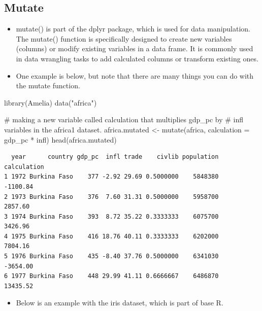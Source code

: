 \documentclass[
  letterpaper,
  DIV=11,
  numbers=noendperiod]{scrreprt}
\newenvironment{Shaded}{\begin{snugshade}}{\end{snugshade}}
\newcommand{\AttributeTok}[1]{\textcolor[rgb]{0.40,0.45,0.13}{#1}}
\newcommand{\CommentTok}[1]{\textcolor[rgb]{0.37,0.37,0.37}{#1}}
\newcommand{\FunctionTok}[1]{\textcolor[rgb]{0.28,0.35,0.67}{#1}}
\newcommand{\NormalTok}[1]{\textcolor[rgb]{0.00,0.23,0.31}{#1}}
\newcommand{\OtherTok}[1]{\textcolor[rgb]{0.00,0.23,0.31}{#1}}
\newcommand{\SpecialCharTok}[1]{\textcolor[rgb]{0.37,0.37,0.37}{#1}}
\newcommand{\StringTok}[1]{\textcolor[rgb]{0.13,0.47,0.30}{#1}}
\providecommand{\tightlist}{%
  \setlength{\itemsep}{0pt}\setlength{\parskip}{0pt}}\usepackage{longtable,booktabs,array}
\begin{document}
\subsection{Mutate}\label{mutate}

\begin{itemize}
\tightlist
\item
  mutate() is part of the dplyr package, which is used for data
  manipulation. The mutate() function is specifically designed to create
  new variables (columns) or modify existing variables in a data frame.
  It is commonly used in data wrangling tasks to add calculated columns
  or transform existing ones.
\item
  One example is below, but note that there are many things you can do
  with the mutate function.
\end{itemize}

\begin{Shaded}
\begin{Highlighting}[]
\FunctionTok{library}\NormalTok{(Amelia)}
\FunctionTok{data}\NormalTok{(}\StringTok{"africa"}\NormalTok{)}

\CommentTok{\# making a new variable called calculation that multiplies gdp\_pc by}
\CommentTok{\# infl variables in the africa1 dataset.}
\NormalTok{africa.mutated }\OtherTok{\textless{}{-}} \FunctionTok{mutate}\NormalTok{(africa, }\AttributeTok{calculation =}\NormalTok{ gdp\_pc }\SpecialCharTok{*}\NormalTok{ infl)}
\FunctionTok{head}\NormalTok{(africa.mutated)}
\end{Highlighting}
\end{Shaded}

\begin{verbatim}
  year      country gdp_pc  infl trade    civlib population calculation
1 1972 Burkina Faso    377 -2.92 29.69 0.5000000    5848380    -1100.84
2 1973 Burkina Faso    376  7.60 31.31 0.5000000    5958700     2857.60
3 1974 Burkina Faso    393  8.72 35.22 0.3333333    6075700     3426.96
4 1975 Burkina Faso    416 18.76 40.11 0.3333333    6202000     7804.16
5 1976 Burkina Faso    435 -8.40 37.76 0.5000000    6341030    -3654.00
6 1977 Burkina Faso    448 29.99 41.11 0.6666667    6486870    13435.52
\end{verbatim}

\begin{itemize}
\tightlist
\item
  Below is an example with the iris dataset, which is part of base R.
\end{itemize}
\end{document}
